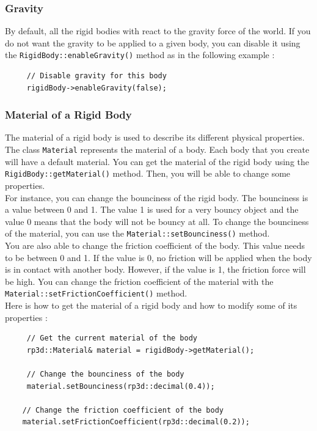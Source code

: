 \documentclass[a4paper,12pt]{article}
\begin{document}
    \subsubsection{Gravity}

    By default, all the rigid bodies with react to the gravity force of the world. If you do not want the gravity to be applied to a given body, you can disable
    it using the \texttt{RigidBody::enableGravity()} method as in the following example : \\

    \begin{lstlisting}
     // Disable gravity for this body
     rigidBody->enableGravity(false);
  \end{lstlisting}

    \subsubsection{Material of a Rigid Body}

    The material of a rigid body is used to describe its different physical properties. The class \texttt{Material} represents the material of a body. Each body that
    you create will have a default material. You can get the material of the rigid body using the \texttt{RigidBody::getMaterial()} method. Then, you will be able to change some
    properties. \\

    For instance, you can change the bounciness of the rigid body. The bounciness is a value between 0 and 1. The value 1 is used for a very bouncy object and the value 0 means that
    the body will not be bouncy at all. To change the bounciness of the material, you can use the \texttt{Material::setBounciness()} method. \\

    You are also able to change the friction coefficient of the body. This value needs to be between 0 and 1. If the value is 0, no friction will be applied when the body is in contact with
    another body. However, if the value is 1, the friction force will be high. You can change the friction coefficient of the material with the
    \texttt{Material::setFrictionCoefficient()} method. \\

    Here is how to get the material of a rigid body and how to modify some of its properties : \\

    \begin{lstlisting}
     // Get the current material of the body
     rp3d::Material& material = rigidBody->getMaterial();

     // Change the bounciness of the body
     material.setBounciness(rp3d::decimal(0.4));

    // Change the friction coefficient of the body
    material.setFrictionCoefficient(rp3d::decimal(0.2));
  \end{lstlisting}
\end{document}
